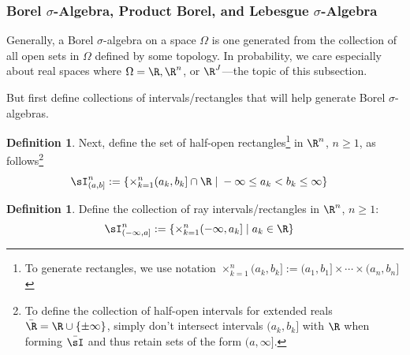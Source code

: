 \documentclass[12pt]{article}
\theoremstyle{plain}
\theoremstyle{definition}
\newtheorem{defn}[thm]{Definition}
\theoremstyle{remark}
\begin{document}
\clearpage
\subsubsection{Borel $\sigma$-Algebra, Product Borel, and Lebesgue
$\sigma$-Algebra}

Generally, a Borel $\sigma$-algebra on a space $\Omega$ is one generated
from the collection of all open sets in $\Omega$ defined by some
topology. In probability, we care especially about real spaces where
$\Omega=\R,\R^n$, or $\R^J$---the topic of this subsection.

But first define collections of intervals/rectangles that will help
generate Borel $\sigma$-algebras.

\begin{defn}
\label{defn:Iab}
Next, define the set of half-open rectangles\footnote{%
  To generate rectangles, we use notation
  $\times_{k=1}^n (a_{k},b_{k}]
  :=
  (a_{1},b_{1}]
  \times \cdots\times
  (a_{n},b_{n}]$
}
in $\R^n$, $n\geq 1$, as follows\footnote{
  To define the collection of half-open intervals for extended reals
  $\bar{\R}=\R\cup\{\pm\infty\}$, simply don't intersect intervals
  $(a_k,b_k]$ with $\R$ when forming $\bar{\sI}$ and thus retain sets of the
  form $(a,\infty]$.
}
\begin{align*}
  \sI^n_{(a,b]} &:=
  \left\{
    \times_{k=1}^n (a_{k},b_{k}] \cap \R
    \;|\; -\infty\leq a_k < b_k \leq \infty
  \right\}
\end{align*}
\end{defn}

\begin{defn}
\label{defn:Iinftya}
Define the collection of ray intervals/rectangles in $\R^n$, $n\geq 1$:
\begin{align}
  \sI^n_{(-\infty,a]} &:=
  \left\{
    \times_{k=1}^n (-\infty,a_{k}]
    \;|\; a_k\in\R
  \right\}
  \notag
\end{align}
\end{defn}
\end{document}
